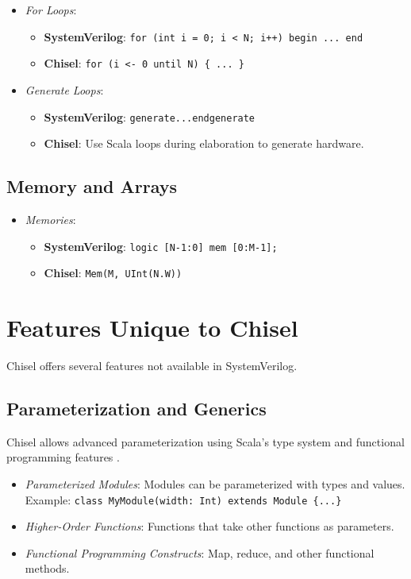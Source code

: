 \begin{itemize}
    \item \textit{For Loops}:
        \begin{itemize}
            \item \textbf{SystemVerilog}: \texttt{for (int i = 0; i < N; i++) begin ... end}
            \item \textbf{Chisel}: \texttt{for (i <- 0 until N) \{ ... \}}
        \end{itemize}
    \item \textit{Generate Loops}:
        \begin{itemize}
            \item \textbf{SystemVerilog}: \texttt{generate...endgenerate}
            \item \textbf{Chisel}: Use Scala loops during elaboration to generate hardware.
        \end{itemize}
\end{itemize}

\subsection{Memory and Arrays}

\begin{itemize}
    \item \textit{Memories}:
        \begin{itemize}
            \item \textbf{SystemVerilog}: \texttt{logic [N-1:0] mem [0:M-1];}
            \item \textbf{Chisel}: \texttt{Mem(M, UInt(N.W))}
        \end{itemize}
\end{itemize}

\section{Features Unique to Chisel}

Chisel offers several features not available in SystemVerilog.

\subsection{Parameterization and Generics}

Chisel allows advanced parameterization using Scala's type system and functional programming features \cite{chisel-doc}.

\begin{itemize}
    \item \textit{Parameterized Modules}: Modules can be parameterized with types and values.
        \newline Example: \texttt{class MyModule(width: Int) extends Module \{...\}}
    \item \textit{Higher-Order Functions}: Functions that take other functions as parameters.
    \item \textit{Functional Programming Constructs}: Map, reduce, and other functional methods.
\end{itemize}

